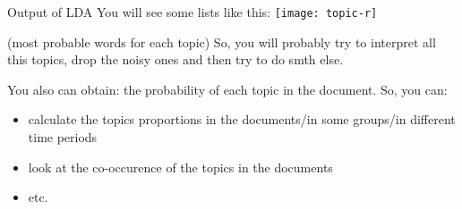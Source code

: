 \documentclass[svgnames]{beamer}
\begin{document}
    \begin{frame}{Output of LDA}
        You will see some lists like this:
        \texttt{[image: topic-r]}

        (most probable words for each topic)
        So, you will probably try to interpret all this topics, drop the noisy ones and then try to do smth else.


        You also can obtain: the probability of each topic in the document. So, you can:
        \begin{itemize}
            \item calculate the topics proportions in the documents/in some groups/in different time periods
            \item look at the co-occurence of the topics in the documents
            \item etc.
        \end{itemize}
    \end{frame}

%
%
%
%
%
%
\end{document}
